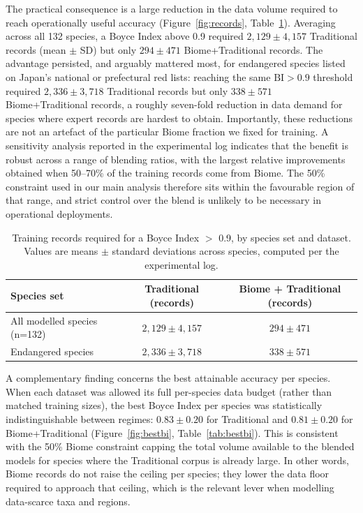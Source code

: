 \documentclass[11pt]{article}
\begin{document}
The practical consequence is a large reduction in the data volume required to reach operationally useful accuracy (Figure~\ref{fig:records}, Table~\ref{tab:records}). Averaging across all 132 species, a Boyce Index above 0.9 required $2{,}129 \pm 4{,}157$ Traditional records (mean $\pm$ SD) but only $294 \pm 471$ Biome+Traditional records. The advantage persisted, and arguably mattered most, for endangered species listed on Japan's national or prefectural red lists: reaching the same $\mathrm{BI} > 0.9$ threshold required $2{,}336 \pm 3{,}718$ Traditional records but only $338 \pm 571$ Biome+Traditional records, a roughly seven-fold reduction in data demand for species where expert records are hardest to obtain. Importantly, these reductions are not an artefact of the particular Biome fraction we fixed for training. A sensitivity analysis reported in the experimental log indicates that the benefit is robust across a range of blending ratios, with the largest relative improvements obtained when 50--70\% of the training records come from Biome. The 50\% constraint used in our main analysis therefore sits within the favourable region of that range, and strict control over the blend is unlikely to be necessary in operational deployments.

\begin{table}[htbp]
\centering
\caption{Training records required for a Boyce Index $>$ 0.9, by species set and dataset. Values are means $\pm$ standard deviations across species, computed per the experimental log.}
\label{tab:records}
\begin{tabular}{lcc}
\toprule
Species set & Traditional (records) & Biome + Traditional (records) \\
\midrule
All modelled species (n=132) & $2{,}129 \pm 4{,}157$ & $294 \pm 471$ \\
Endangered species           & $2{,}336 \pm 3{,}718$ & $338 \pm 571$ \\
\bottomrule
\end{tabular}
\end{table}

A complementary finding concerns the best attainable accuracy per species. When each dataset was allowed its full per-species data budget (rather than matched training sizes), the best Boyce Index per species was statistically indistinguishable between regimes: $0.83 \pm 0.20$ for Traditional and $0.81 \pm 0.20$ for Biome+Traditional (Figure~\ref{fig:bestbi}, Table~\ref{tab:bestbi}). This is consistent with the 50\% Biome constraint capping the total volume available to the blended models for species where the Traditional corpus is already large. In other words, Biome records do not raise the ceiling per species; they lower the data floor required to approach that ceiling, which is the relevant lever when modelling data-scarce taxa and regions.
\end{document}
